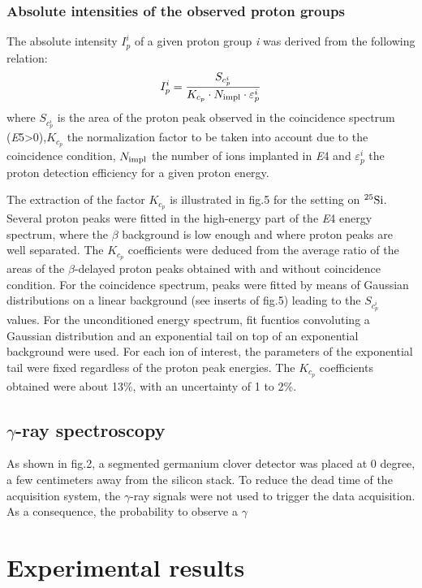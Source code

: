 \documentclass[UTF8]{ctexart}
\begin{document}
\subsubsection{Absolute intensities of the observed proton groups}
The absolute intensity $I_{p}^{i}$ of a given proton group \textit{i} was derived from the following relation:
\begin{equation}
    I_{p}^{i}=\frac{S_{c_{p}^{i}}}{K_{c_{p}} \cdot N_{\textnormal{impl}}\cdot \varepsilon_{p}^{i}}
\end{equation}
where $S_{c_{p}^{i}}$ is the area of the proton peak observed in the coincidence spectrum (\textit{E}5>0),$K_{c_{p}}$ the normalization factor to be taken into account due to the coincidence condition, $N_{\textnormal{impl}}$ the number of ions implanted in \textit{E}4 and $\varepsilon_{p}^{i}$ the proton detection efficiency for a given proton energy.

The extraction of the factor $K_{c_{p}}$ is illustrated in fig.5 for the setting on $^{25}\textnormal{Si}$. Several proton peaks were fitted in the high-energy part of the \textit{E}4 energy spectrum, where the $\beta$ background is low enough and where proton peaks are well separated. The $K_{c_{p}}$ coefficients were deduced from the average ratio of the areas of the $\beta$-delayed proton peaks obtained with and without coincidence condition. For the coincidence spectrum, peaks were fitted by means of Gaussian distributions on a linear background (see inserts of fig.5) leading to the $S_{c_{p}^{i}}$ values. For the unconditioned energy spectrum, fit fucntios convoluting a Gaussian distribution and an exponential tail on top of an exponential background were used. For each ion of interest, the parameters of the exponential tail were fixed regardless of the proton peak energies. The $K_{c_{p}}$ coefficients obtained were about 13\%, with an uncertainty of 1 to 2\%.



\subsection{$\gamma$-ray spectroscopy}
As shown in fig.2, a segmented germanium clover detector was placed at 0 degree, a few centimeters away from the silicon stack. To reduce the dead time of the acquisition system, the $\gamma$-ray signals were not used to trigger the data acquisition. As a consequence, the probability to observe a $\gamma$
\section{Experimental results}
\end{document}

